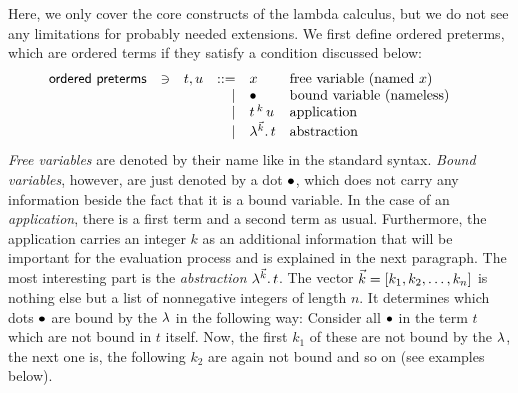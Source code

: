 \documentclass[submission,copyright,creativecommons]{eptcs}
\begin{document}
Here, we only cover the core constructs of the lambda calculus, but we do not see any limitations for probably needed extensions. We first define ordered preterms, which are ordered terms if they satisfy a condition discussed below:
\[
\begin{array}{lllrll@{\qquad}}
\mathsf{ordered \ preterms}       & \ni & t,u & ::= & x & \mbox{free variable (named $x$)} \\
			                   &&& \mid & \ovar & \mbox{bound variable (nameless)} \\
			                   &&& \mid & \ApO t k u & \mbox{application} \\
			                   &&& \mid & \LaO {\vec k} t & \mbox{abstraction} \\
\end{array}
\]
\emph{Free variables} are denoted by their name like in the standard syntax. \emph{Bound variables}, however, are just denoted by a dot $\mathord{\bullet}$, which does not carry any information beside the fact that it is a bound variable. 
In the case of an \emph{application}, there is a first term and a second term as usual. 
Furthermore, the application carries an integer $k$ as an additional information that will be important for the evaluation process and is explained in the next paragraph.
The most interesting part is the \emph{abstraction} $\lambda ^{\vec k} . \, t$. The vector $\vec k = [k_1, k_2, \ldots, k_n]$ is nothing else but a list of nonnegative  integers of length $n$. It determines which dots $\mathord{\bullet}$ are bound by the $\lambda$ in the following way: Consider all $\mathord{\bullet}$ in the term $t$ which are not bound in $t$ itself. Now, the first $k_1$ of these are not bound by the $\lambda$, the next one is, the following $k_2$ are again not bound and so on (see examples below). 
\end{document}
